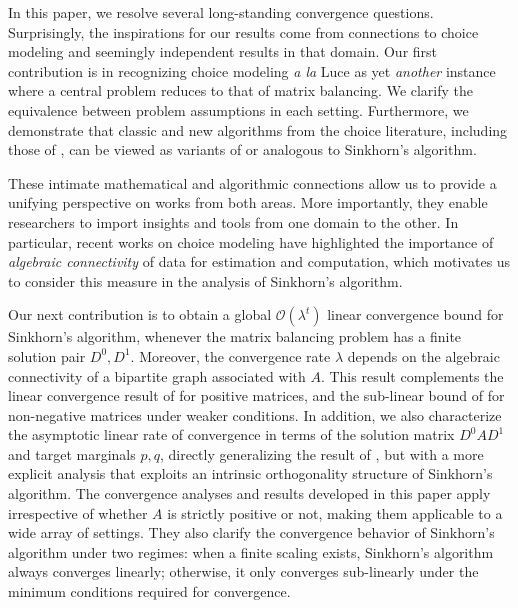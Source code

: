 In this paper, we resolve several long-standing convergence questions. Surprisingly, the inspirations for our results come from connections to choice modeling and seemingly independent results in that domain. Our first contribution is in recognizing choice modeling \emph{a la} Luce as yet \emph{another} instance where a central problem reduces to that of matrix balancing. We clarify the equivalence between problem assumptions in each setting. Furthermore, we demonstrate that classic and new algorithms from the choice literature, including those of \citet{zermelo1929berechnung,dykstra1956note,ford1957solution,berry1995automobile,hunter2004mm,maystre2017choicerank,agarwal2018accelerated}, can be viewed as variants of or analogous to Sinkhorn's algorithm.

These intimate mathematical and algorithmic connections allow us to provide a unifying perspective on works from both areas. More importantly, they enable researchers to import insights and tools from one domain to the other. In particular, recent works on choice modeling \citep{shah2015estimation,seshadri2020learning,vojnovic2020convergence} have highlighted the importance of \emph{algebraic connectivity} of data for estimation and computation, which motivates us to consider this measure in the analysis of Sinkhorn's algorithm.

Our next contribution is to obtain a global $\mathcal{O}(\lambda^t)$ linear convergence bound for Sinkhorn's algorithm, whenever the matrix balancing problem has a finite solution pair $D^0,D^1$. Moreover, the convergence rate $\lambda$ depends on the algebraic connectivity of a bipartite graph associated with $A$. This result complements the linear convergence result of \citet{franklin1989scaling} for positive matrices, and the sub-linear bound of \citet{leger2021gradient} for non-negative matrices under weaker conditions. In addition, we also characterize the asymptotic linear rate of convergence in terms of the solution matrix $D^0AD^1$ and target marginals $p,q$, directly generalizing the result of \citet{knight2008sinkhorn}, but with a more explicit analysis that exploits an intrinsic orthogonality structure of Sinkhorn's algorithm. The convergence analyses and results developed in this paper apply irrespective of whether $A$ is strictly positive or not, making them applicable to a wide array of settings. They also clarify the convergence behavior of Sinkhorn's algorithm under two regimes: when a finite scaling exists, Sinkhorn's algorithm always converges linearly; otherwise, it only converges sub-linearly under the minimum conditions required for convergence.


